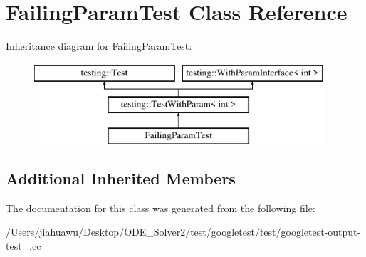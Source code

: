 \hypertarget{class_failing_param_test}{}\section{Failing\+Param\+Test Class Reference}
\label{class_failing_param_test}
Inheritance diagram for Failing\+Param\+Test\+:\begin{figure}[H]
\begin{center}
\leavevmode
\includegraphics[height=3.000000cm]{class_failing_param_test}
\end{center}
\end{figure}
\subsection*{Additional Inherited Members}


The documentation for this class was generated from the following file\+:\begin{DoxyCompactItemize}
\item 
/\+Users/jiahuawu/\+Desktop/\+O\+D\+E\+\_\+\+Solver2/test/googletest/test/googletest-\/output-\/test\+\_\+.\+cc\end{DoxyCompactItemize}
